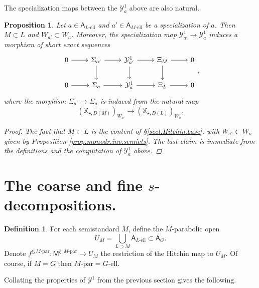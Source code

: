 \documentclass[openany]{amsbook}
\newtheorem{proposition}[theorem]{Proposition}
\theoremstyle{definition}
\newtheorem{definition}[theorem]{Definition}
\theoremstyle{remark}
\numberwithin{equation}{section}
\newcommand{\cY}{\mathcal{Y}}
\renewcommand{\-}{\operatorname{-}}
\newcommand{\el}{\text{-ell}}
\newcommand{\bM}{\mathsf{M}}
\newcommand{\bA}{\mathsf{A}}
\newcommand{\bX}{\mathbb{X}}
\newcommand{\bAe}[1]{\bA_{#1\el}}
\newcommand{\Gell}{G\text{-ell}}
\newcommand{\Mpar}{M\text{-par}}
\begin{document}
The specialization maps between the $\cY^1_a$ above are also natural. 

\begin{proposition}\label{prop.nat.Y1.obvious}
    Let $a \in \bAe{L}$ and $a' \in \bAe{M}$ be a specialization of $a$. Then $M \subset L$ and $W_{a'} \subset W_a$. Moreover, the specialization map $\cY^1_{a'} \to \cY^1_a$ induces a morphism of short exact sequences
    $$
        \begin{tikzcd}[ampersand replacement=\&]
            0 \ar[r] \& \Sigma_{a'} \ar[r] \ar[d] \& \cY^1_{a'} \ar[r] \ar[d] \& \Xi_{M} \ar[r] \ar[d] \& 0 \\
            0 \ar[r] \& \Sigma_a \ar[r] \& \cY^1_{a} \ar[r] \& \Xi_L\ar[r] \& 0
        \end{tikzcd},
    $$
    where the morphism $\Sigma_{a'} \to \Sigma_a$ is induced from the natural map 
    $$
        (\bX_{\star, D(M)})_{W_{a'}} \to (\bX_{\star, D(L)})_{W_a}.
    $$
    \begin{proof}
        The fact that $M \subset L$ is the content of \S \ref{sect.Hitchin.base}, with $W_{a'} \subset W_a$ given by Proposition \ref{prop.monodr.inv.semicts}. The last claim is immediate from the definitions and the computation of $\cY^1_a$ above.
    \end{proof}
\end{proposition}






\section{\texorpdfstring{The coarse and fine $s$-decompositions.}{The s-decomposition.}}

\begin{definition}\label{def.Mpar.open}
    For each semistandard $M$, define the $M$-parabolic open $$U_M = \bigcup_{L \supset M} \bAe{L} \subset \bA_G.$$ 
    Denote $f^{\xi, \Mpar} : \bM^{\xi, \Mpar} \to U_M$ the restriction of the Hitchin map to $U_M$. Of course, if $M = G$ then $\Mpar = \Gell$.
\end{definition}
 

Collating the properties of $\cY^1$ from the previous section gives the following.
\end{document}

